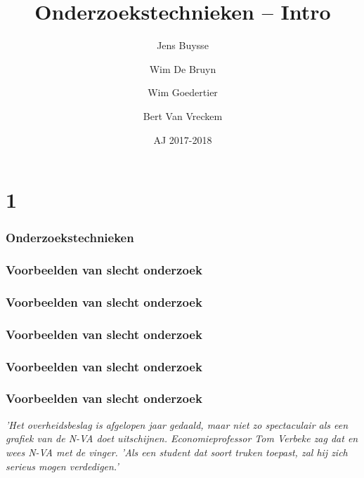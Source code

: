 \documentclass{beamer}
\title[Intro]{Onderzoekstechnieken -- Intro}
\author{Jens Buysse \and Wim {De Bruyn} \and Wim Goedertier \and Bert {Van Vreckem}}
\date{AJ 2017-2018}
\begin{document}

\HoGentLogo

\titleframe


\section{1}


\begin{frame}
  \frametitle{Onderzoekstechnieken}

\end{frame}

\begin{frame}
  \frametitle{Voorbeelden van slecht onderzoek}

\end{frame}

\begin{frame}
  \frametitle{Voorbeelden van slecht onderzoek}

\end{frame}

\begin{frame}
  \frametitle{Voorbeelden van slecht onderzoek}

\end{frame}

\begin{frame}
  \frametitle{Voorbeelden van slecht onderzoek}

\end{frame}

\begin{frame}
	\frametitle{Voorbeelden van slecht onderzoek}
	{\tiny \textit{'Het overheidsbeslag is afgelopen jaar gedaald, maar niet zo spectaculair als een grafiek van de N-VA doet uitschijnen. Economieprofessor Tom Verbeke zag dat en wees N-VA met de vinger. 'Als een student dat soort truken toepast, zal hij zich serieus mogen verdedigen.'} }
\end{frame}
\end{document}
